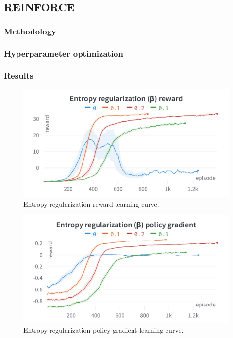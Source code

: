 \documentclass{article}
\begin{document}
\subsection{REINFORCE}
\label{A-REINFORCE}


\subsubsection{Methodology}
\label{R-Method}

\subsubsection{Hyperparameter optimization}
\label{R-HPO}

\subsubsection{Results}
\label{R-Results}

\begin{figure}[htbp]
    \centering
    \includegraphics[width=\linewidth]{figs/ER-R.png}
    \caption{Entropy regularization reward learning curve.}
    \label{fig:er-r}
\end{figure}

\begin{figure}[htbp]
    \centering
    \includegraphics[width=\linewidth]{figs/ER-PG.png}
    \caption{Entropy regularization policy gradient learning curve.}
    \label{fig:er-pg}
\end{figure}
\end{document}
